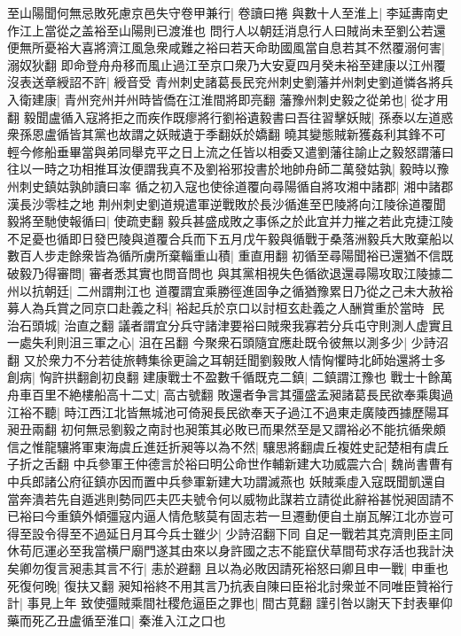 至山陽聞何無忌敗死慮京邑失守卷甲兼行|{
	卷讀曰捲}
與數十人至淮上|{
	李延夀南史作江上當從之盖裕至山陽則已渡淮也}
問行人以朝廷消息行人曰賊尚未至劉公若還便無所憂裕大喜將濟江風急衆咸難之裕曰若天命助國風當自息若其不然覆溺何害|{
	溺奴狄翻}
即命登舟舟移而風止過江至京口衆乃大安夏四月癸未裕至建康以江州覆沒表送章綬詔不許|{
	綬音受}
青州刺史諸葛長民兖州刺史劉藩并州刺史劉道憐各將兵入衛建康|{
	青州兖州并州時皆僑在江淮間將即亮翻}
藩豫州刺史毅之從弟也|{
	從才用翻}
毅聞盧循入寇將拒之而疾作既瘳將行劉裕遺毅書曰吾往習擊妖賊|{
	孫泰以左道惑衆孫恩盧循皆其黨也故謂之妖賊遺于季翻妖於嬌翻}
曉其變態賊新獲姦利其鋒不可輕今修船垂畢當與弟同舉克平之日上流之任皆以相委又遣劉藩往諭止之毅怒謂藩曰往以一時之功相推耳汝便謂我真不及劉裕邪投書於地帥舟師二萬發姑孰|{
	毅時以豫州刺史鎮姑孰帥讀曰率}
循之初入寇也使徐道覆向尋陽循自將攻湘中諸郡|{
	湘中諸郡漢長沙零桂之地}
荆州刺史劉道規遣軍逆戰敗於長沙循進至巴陵將向江陵徐道覆聞毅將至馳使報循曰|{
	使疏吏翻}
毅兵甚盛成敗之事係之於此宜并力摧之若此克捷江陵不足憂也循即日發巴陵與道覆合兵而下五月戊午毅與循戰于桑落洲毅兵大敗棄船以數百人步走餘衆皆為循所虜所棄輜重山積|{
	重直用翻}
初循至尋陽聞裕已還猶不信既破毅乃得審問|{
	審者悉其實也問音問也}
與其黨相視失色循欲退還尋陽攻取江陵據二州以抗朝廷|{
	二州謂荆江也}
道覆謂宜乘勝徑進固争之循猶豫累日乃從之己未大赦裕募人為兵賞之同京口赴義之科|{
	裕起兵於京口以討桓玄赴義之人酬賞重於當時}
民治石頭城|{
	治直之翻}
議者謂宜分兵守諸津要裕曰賊衆我寡若分兵屯守則測人虚實且一處失利則沮三軍之心|{
	沮在呂翻}
今聚衆石頭隨宜應赴既令彼無以測多少|{
	少詩沼翻}
又於衆力不分若徒旅轉集徐更論之耳朝廷聞劉毅敗人情恟懼時北師始還將士多創病|{
	恟許拱翻創初良翻}
建康戰士不盈數千循既克二鎮|{
	二鎮謂江豫也}
戰士十餘萬舟車百里不絶樓船高十二丈|{
	高古號翻}
敗還者争言其彊盛孟昶諸葛長民欲奉乘輿過江裕不聽|{
	時江西江北皆無城池可倚昶長民欲奉天子過江不過東走廣陵西據歷陽耳昶丑兩翻}
初何無忌劉毅之南討也昶策其必敗已而果然至是又謂裕必不能抗循衆頗信之惟龍驤將軍東海虞丘進廷折昶等以為不然|{
	驤思將翻虞丘複姓史記楚相有虞丘子折之舌翻}
中兵參軍王仲德言於裕曰明公命世作輔新建大功威震六合|{
	魏尚書曹有中兵郎諸公府征鎮亦因而置中兵參軍新建大功謂滅燕也}
妖賊乘虛入寇既聞凱還自當奔潰若先自遁逃則勢同匹夫匹夫號令何以威物此謀若立請從此辭裕甚悦昶固請不已裕曰今重鎮外傾彊寇内逼人情危駭莫有固志若一旦遷動便自土崩瓦解江北亦豈可得至設令得至不過延日月耳今兵士雖少|{
	少詩沼翻下同}
自足一戰若其克濟則臣主同休苟厄運必至我當横尸廟門遂其由來以身許國之志不能竄伏草間苟求存活也我計決矣卿勿復言昶恚其言不行|{
	恚於避翻}
且以為必敗因請死裕怒曰卿且申一戰|{
	申重也}
死復何晚|{
	復扶又翻}
昶知裕終不用其言乃抗表自陳曰臣裕北討衆並不同唯臣贊裕行計|{
	事見上年}
致使彊賊乘間社稷危逼臣之罪也|{
	間古莧翻}
謹引咎以謝天下封表畢仰藥而死乙丑盧循至淮口|{
	秦淮入江之口也}
